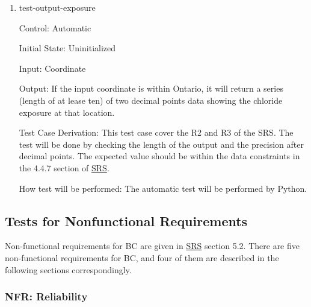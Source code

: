 \documentclass[12pt, titlepage]{article}
\begin{document}
\begin{enumerate}

\item{test-output-exposure\\}

Control: Automatic
					
Initial State: Uninitialized
					
Input: Coordinate
					
Output: If the input coordinate is within Ontario, it will return a series (length of at lease ten) of two decimal points data showing the chloride exposure at that location.

Test Case Derivation: This test case cover the R2 and R3 of the SRS. The test will be done by checking the length of the output and the precision after decimal points. The expected value should be within the data constraints in the 4.4.7 section of \href{https://github.com/CynthiaLiu0805/BridgeCorrosion/blob/main/docs/SRS/SRS.pdf}{SRS}.

					
How test will be performed: The automatic test will be performed by Python.

\end{enumerate}


\subsection{Tests for Nonfunctional Requirements}\label{TNR}

Non-functional requirements for BC are given in \href{https://github.com/CynthiaLiu0805/BridgeCorrosion/blob/main/docs/SRS/SRS.pdf}{SRS} section 5.2. There are five non-functional requirements for BC, and four of them are described in the following sections correspondingly.



\subsubsection{NFR: Reliability}\label{t_reliability}
		
\end{document}
